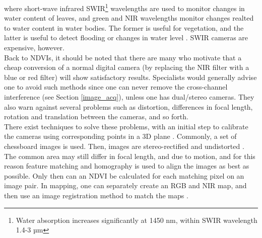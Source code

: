where short-wave infrared SWIR\footnote{Water absorption increases significantly at 1450 nm, within SWIR wavelength 1.4-3 µm} wavelengths are used to monitor changes in water content of leaves, and green and NIR wavelengths monitor changes realted to water content in water bodies. The former is useful for vegetation, and the latter is useful to detect flooding or changes in water level \cite{ndwi}. SWIR cameras are expensive, however.\\

Back to NDVIs, it should be noted that there are many who motivate that a cheap conversion of a normal digital camera (by replacing the NIR filter with a blue or red filter) will show satisfactory results. Specialists would generally advise one to avoid such methods since one can never remove the cross-channel interference (see Section \ref{image_acq}), unless one has dual/stereo cameras. They also warn against several problems such as distortion, differences in focal length, rotation and translation between the cameras, and so forth.\\

There exist techniques to solve these problems, with an initial step to calibrate the cameras using corresponding points in a 3D plane \cite{calib3d}. Commonly, a set of chessboard images is used. Then, images are stereo-rectified \cite{calib3d} and undistorted \cite{calib3d}. The common area may still differ in focal length, and due to motion, and for this reason feature matching and homography is used to align the images as best as possible. Only then can an NDVI be calculated for each matching pixel on an image pair. In mapping, one can separately create an RGB and NIR map, and then use an image registration method to match the maps \cite{bunwarpj}.

